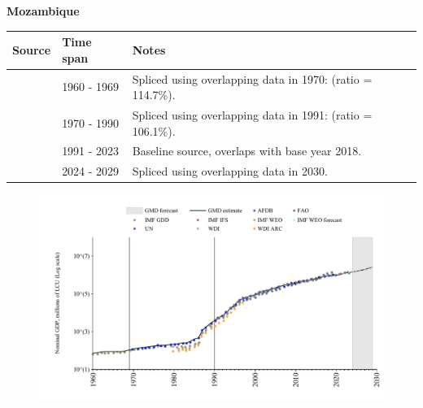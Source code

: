 \documentclass[12pt,a4paper,landscape]{article}
\begin{document}
\begin{adjustbox}{max totalsize={\paperwidth}{\paperheight},center}
\begin{minipage}[t][\textheight][t]{\textwidth}
\vspace*{0.5cm}
{}
\begin{center}
{\Large\bfseries Mozambique}
\end{center}
\vspace{0.5cm}
\begin{table}[H]
\centering
\small
\begin{tabular}{|l|l|l|}
\hline
\textbf{Source} & \textbf{Time span} & \textbf{Notes} \\
\hline
\rowcolor{white}\cite{IMF_GDD}& 1960 - 1969 &Spliced using overlapping data in 1970: (ratio = 114.7\%).\\
\rowcolor{lightgray}\cite{UN}& 1970 - 1990 &Spliced using overlapping data in 1991: (ratio = 106.1\%).\\
\rowcolor{white}\cite{WDI}& 1991 - 2023 &Baseline source, overlaps with base year 2018.\\
\rowcolor{lightgray}\cite{IMF_WEO_forecast}& 2024 - 2029 &Spliced using overlapping data in 2030.\\
\hline
\end{tabular}
\end{table}
\begin{figure}[H]
\centering
\includegraphics[width=\textwidth,height=0.6\textheight,keepaspectratio]{graphs/MOZ_nGDP.pdf}
\end{figure}
\end{minipage}
\end{adjustbox}
\end{document}
